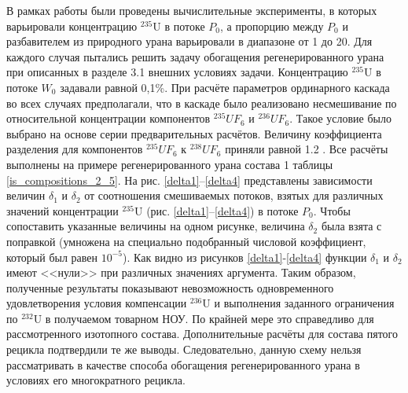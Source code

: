 В рамках работы были проведены вычислительные эксперименты, в которых варьировали концентрацию $^{235}$U в потоке $P_0$, а пропорцию между $P_0$ и разбавителем из природного урана варьировали в диапазоне от 1 до 20. Для каждого случая пытались решить задачу обогащения регенерированного урана при описанных в разделе 3.1 внешних условиях задачи. Концентрацию $^{235}$U в потоке $W_0$ задавали равной 0,1\%. При расчёте параметров ординарного каскада во всех случаях предполагали, что в каскаде было реализовано несмешивание по относительной концентрации компонентов $^{235}UF_6$ и $^{236}UF_6$. Такое условие было выбрано на основе серии предварительных расчётов. Величину коэффициента разделения для компонентов  $^{235}UF_6$ к $^{238}UF_6$ приняли равной 1.2  \cite{smirnovEvolutionIsotopicComposition2012}. Все расчёты выполнены на примере регенерированного урана состава 1 таблицы \ref{is_compositions_2_5}.
На рис. \ref{delta1}--\ref{delta4} представлены зависимости величин $\delta_1$ и $\delta_2$ от соотношения смешиваемых потоков, взятых для различных значений концентрации $^{235}$U (рис. \ref{delta1}--\ref{delta4}) в потоке $P_0$. Чтобы сопоставить указанные величины на одном рисунке, величина $\delta_2$ была взята с поправкой (умножена на специально подобранный числовой коэффициент, который был равен $10^{-5}$).
Как видно из рисунков \ref{delta1}-\ref{delta4} функции $\delta_1$ и $\delta_2$ имеют <<нули>> при различных значениях аргумента. Таким образом, полученные результаты показывают невозможность одновременного удовлетворения условия компенсации $^{236}$U и выполнения заданного ограничения по $^{232}$U в получаемом товарном НОУ. По крайней мере это справедливо для рассмотренного изотопного состава. Дополнительные расчёты для состава пятого рецикла подтвердили те же выводы. Следовательно, данную схему нельзя рассматривать в качестве способа обогащения регенерированного урана в условиях его многократного рецикла.


